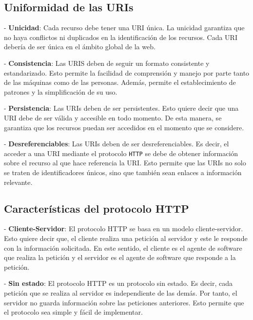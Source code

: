 \documentclass[11pt]{report}
\begin{document}
\subsection{Uniformidad de las URIs} \label{subsec:Uniformidad-URIs}

\indent \indent \indent -  \textbf{Unicidad}: Cada recurso debe tener una URI única. La unicidad garantiza que no haya conflictos ni duplicados en la identificación de los recursos. Cada URI debería de ser única en el ámbito global de la web.

\indent \indent \indent -  \textbf{Consistencia}: Las URIS deben de seguir un formato consistente y estandarizado. Esto permite la facilidad de comprensión y manejo por parte tanto de las máquinas como de las personas. Además, permite el establecimiento de patrones y la simplificación de su uso.

\indent \indent \indent -  \textbf{Persistencia}: Las URIs deben de ser persistentes. Esto quiere decir que una URI debe de ser válida y accesible en todo momento. De esta manera, se garantiza que los recursos puedan ser accedidos en el momento que se considere.

\indent \indent \indent -  \textbf{Desreferenciables}: Las URIs deben de ser desreferenciables. Es decir, el acceder a una URI mediante el protocolo \texttt{HTTP} se debe de obtener información sobre el recurso al que hace referencia la URI. Esto permite que las URIs no solo se traten de identificadores únicos, sino 	que también sean enlaces a información relevante.

\subsection{Características del protocolo HTTP} \label{subsec:Características-HTTP}

\indent \indent \indent - \textbf{Cliente-Servidor}: El protocolo HTTP se basa en un modelo cliente-servidor. Esto quiere decir que, el cliente realiza una petición al servidor y este le responde con la información solicitada. En este sentido, el cliente es el agente de software que realiza la petición y el servidor es el agente de software que responde a la petición.

\indent \indent \indent - \textbf{Sin estado}: El protocolo HTTP es un protocolo sin estado. Es decir, cada petición que se realiza al servidor es independiente de las demás. Por tanto, el servidor no guarda información sobre las peticiones anteriores. Esto permite que el protocolo sea simple y fácil de implementar.
\end{document}

